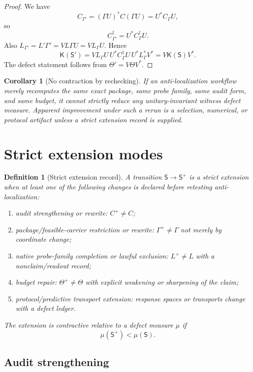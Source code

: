 \documentclass[11pt]{article}
\newtheorem{corollary}[theorem]{Corollary}
\newtheorem{definition}[theorem]{Definition}
\newcommand{\K}{\mathsf K}
\newcommand{\Sstate}{\mathsf S}
\begin{document}
\begin{proof}
We have
\[
  C_{\Gamma'}=(\Gamma U)^*C(\Gamma U)=U^*C_\Gamma U,
\]
so
\[
  C_{\Gamma'}^\dagger=U^*C_\Gamma^\dagger U.
\]
Also $L_{\Gamma'}=L'\Gamma'=VL\Gamma U=V L_\Gamma U$. Hence
\[
  \K(\Sstate')
  =V L_\Gamma U\, U^*C_\Gamma^\dagger U\, U^*L_\Gamma^*V^*
  =V\K(\Sstate)V^*.
\]
The defect statement follows from $\Theta'=V\Theta V^*$.
\end{proof}

\begin{corollary}[No contraction by rechecking]
If an anti-localization workflow merely recomputes the same exact package, same probe family, same audit form, and same budget, it cannot strictly reduce any unitary-invariant witness defect measure. Apparent improvement under such a rerun is a selection, numerical, or protocol artifact unless a strict extension record is supplied.
\end{corollary}

\section{Strict extension modes}

\begin{definition}[Strict extension record]
A transition $\Sstate\to\Sstate^+$ is a strict extension when at least one of the following changes is declared before retesting anti-localization:
\begin{enumerate}[label=(\roman*)]
  \item audit strengthening or rewrite: $C^+\ne C$;
  \item package/feasible-carrier restriction or rewrite: $\Gamma^+\ne\Gamma$ not merely by coordinate change;
  \item native probe-family completion or lawful exclusion: $L^+\ne L$ with a nonclaim/readout record;
  \item budget repair: $\Theta^+\ne\Theta$ with explicit weakening or sharpening of the claim;
  \item protocol/predictive transport extension: response spaces or transports change with a defect ledger.
\end{enumerate}
The extension is contractive relative to a defect measure $\mu$ if
\[
  \mu(\Sstate^+)<\mu(\Sstate).
\]
\end{definition}

\subsection{Audit strengthening}
\end{document}
